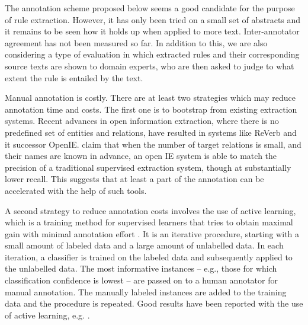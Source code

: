 \documentclass[10pt, a4paper]{article}
\begin{document}
The annotation scheme proposed below seems a good candidate for the purpose of rule extraction.
However, it has only been tried on a small set of abstracts and it remains to be seen how it holds up when applied to more text.
Inter-annotator agreement has not been measured so far.
In addition to this, we are also considering a type of evaluation in which extracted rules and their corresponding source texts are shown to domain experts, who are then asked to judge to what extent the rule is entailed by the text. 

Manual annotation is costly. There are at least two strategies which may reduce annotation time and costs. 
The first one is to bootstrap from existing extraction systems.
Recent advances in open information extraction, where there is no predefined set of entities and relations, have resulted in systems like ReVerb \cite{Fader2011Identifying} and it successor OpenIE.
 claim that when the number of target relations is small, and their
names are known in advance, an open IE system is able to match the precision of a traditional
supervised extraction system, though at substantially lower recall.
This suggests that at least a part of the annotation can be accelerated with the help of such tools.

A second strategy to reduce annotation costs involves the use of active learning, which is a training method for supervised learners that tries to obtain maximal gain with minimal annotation effort \cite{Olsson09}.
It is an iterative procedure, starting with a small amount of labeled data and a large amount of unlabelled data.
In each iteration, a classifier is trained on the labeled data and subsequently applied to the unlabelled data.
The most informative instances -- e.g., those for which classification confidence is lowest -- are passed on to a human annotator for manual annotation.
The manually labeled instances are added to the training data and the procedure is repeated.
Good results have been reported with the use of active learning, e.g. \cite{gamback2011active}.
\end{document}
